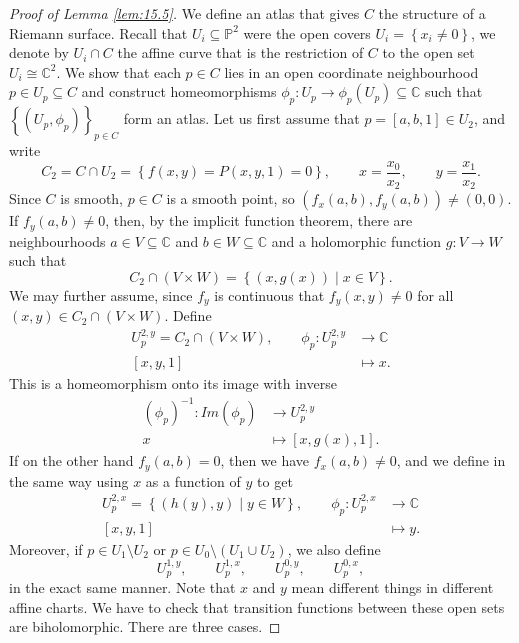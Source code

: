 \documentclass{article}
\newcommand{\C}{\mathbb{C}}
\renewcommand{\P}{\mathbb{P}}
\newcommand{\rb}[1]{\left( #1 \right)}
\renewcommand{\sb}[1]{\left[ #1 \right]}
\newcommand{\cb}[1]{\left\{ #1 \right\}}
\theoremstyle{definition}\newtheorem{definition}{Definition}[section]
\theoremstyle{definition}\newtheorem{notation}[definition]{Notation}
\theoremstyle{definition}\newtheorem{remark}[definition]{Remark}
\theoremstyle{definition}\newtheorem{example1}[definition]{Example}
\theoremstyle{definition}\newtheorem{fact}{Fact}
\theoremstyle{definition}\newtheorem{exercise}{Exercise}
\theoremstyle{definition}\newtheorem*{example2}{Example}
\begin{document}
\begin{proof}[Proof of Lemma \ref{lem:15.5}]
We define an atlas that gives $ C $ the structure of a Riemann surface. Recall that $ U_i \subseteq \P^2 $ were the open covers $ U_i = \cb{x_i \ne 0} $, we denote by $ U_i \cap C $ the affine curve that is the restriction of $ C $ to the open set $ U_i \cong \C^2 $. We show that each $ p \in C $ lies in an open coordinate neighbourhood $ p \in U_p \subseteq C $ and construct homeomorphisms $ \phi_p : U_p \to \phi_p\rb{U_p} \subseteq \C $ such that $ \cb{\rb{U_p, \phi_p}}_{p \in C} $ form an atlas. Let us first assume that $ p = \sb{a, b, 1} \in U_2 $, and write
$$ C_2 = C \cap U_2 = \cb{f\rb{x, y} = P\rb{x, y, 1} = 0}, \qquad x = \dfrac{x_0}{x_2}, \qquad y = \dfrac{x_1}{x_2}. $$
Since $ C $ is smooth, $ p \in C $ is a smooth point, so $ \rb{f_x\rb{a, b}, f_y\rb{a, b}} \ne \rb{0, 0} $. If $ f_y\rb{a, b} \ne 0 $, then, by the implicit function theorem, there are neighbourhoods $ a \in V \subseteq \C $ and $ b \in W \subseteq \C $ and a holomorphic function $ g : V \to W $ such that
$$ C_2 \cap \rb{V \times W} = \cb{\rb{x, g\rb{x}} \mid x \in V}. $$
We may further assume, since $ f_y $ is continuous that $ f_y\rb{x, y} \ne 0 $ for all $ \rb{x, y} \in C_2 \cap \rb{V \times W} $. Define
\begin{align*}
U_p^{2, y} = C_2 \cap \rb{V \times W}, \qquad \phi_p : U_p^{2, y} & \to \C \\
\sb{x, y, 1} & \mapsto x.
\end{align*}
This is a homeomorphism onto its image with inverse
\begin{align*}
\rb{\phi_p}^{-1} : Im\rb{\phi_p} & \to U_p^{2, y} \\
x & \mapsto \sb{x, g\rb{x}, 1}.
\end{align*}
If on the other hand $ f_y\rb{a, b} = 0 $, then we have $ f_x\rb{a, b} \ne 0 $, and we define in the same way using $ x $ as a function of $ y $ to get
\begin{align*}
U_p^{2, x} = \cb{\rb{h\rb{y}, y} \mid y \in W}, \qquad \phi_p : U_p^{2, x} & \to \C \\
\sb{x, y, 1} & \mapsto y.
\end{align*}
Moreover, if $ p \in U_1 \setminus U_2 $ or $ p \in U_0 \setminus \rb{U_1 \cup U_2} $, we also define
$$ U_p^{1, y}, \qquad U_p^{1, x}, \qquad U_p^{0, y}, \qquad U_p^{0, x}, $$
in the exact same manner. Note that $ x $ and $ y $ mean different things in different affine charts. We have to check that transition functions between these open sets are biholomorphic. There are three cases.

\end{proof}
\end{document}
